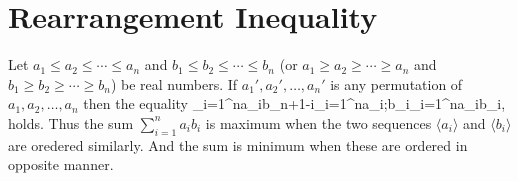 \section{Rearrangement Inequality}
\starttheorem
  Let $a_1\leq a_2\leq\cdots\leq a_n$ and $b_1\leq b_2\leq\cdots\leq b_n$ (or $a_1\geq a_2\geq\cdots\geq a_n$ and $b_1\geq
  b_2\geq\cdots\geq b_n$) be real numbers. If $a_1', a_2', \ldots, a_n'$ is any permutation of $a_1, a_2, \ldots, a_n$ then the
  equality
  \placeformula\startformula
    \sum_{i=1}^na_ib_{n+1-i}\leq \sum_{i=1}^na_i;b_i\leq\sum_{i=1}^na_ib_i,
  \stopformula
  holds. Thus the sum $\displaystyle\sum_{i=1}^na_ib_i$ is maximum when the two sequences $\langle a_i\rangle$ and $\langle
  b_i\rangle$ are oredered similarly. And the sum is minimum when these are ordered in opposite manner.
\stoptheorem

